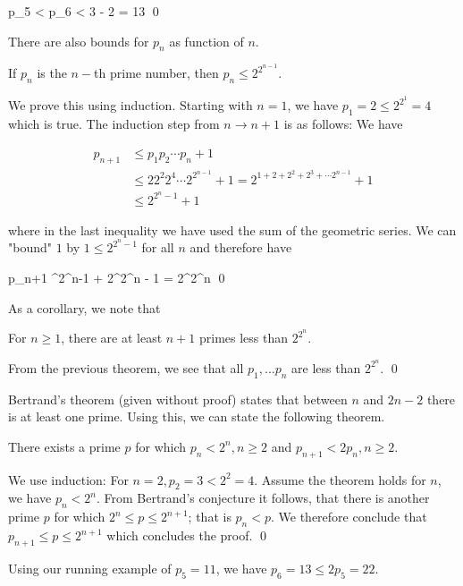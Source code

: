 \bee
p_5 < p_6 < 3  - 2 = 13 \qed
\eee

There are also bounds for $p_n$ as function of $n$.

\begin{theorem}
    If $p_n$ is the $n-$th prime number, then $p_n \leq 2^{2^{n-1}}$.
\end{theorem}

We prove this using induction. Starting with $n=1$, we have $p_1 = 2 \leq 2^{2^{1}} = 4$ which is true. The induction step from $n \rightarrow n+1$ is as follows: We have

\begin{align*}
p_{n+1} & \leq p_1 p_2 \cdots p_n + 1 \\
        & \leq 2 2^2 2^4 \cdots 2^{2^{n-1}} + 1 = 2^{1 + 2 + 2^2 + 2^3 + \cdots 2^{n-1}} + 1 \\ 
        & \leq 2^{2^{n}-1} + 1
\end{align*}

where in the last inequality we have used the sum of the geometric series. We can "bound" $1$ by $1 \leq 2^{2^{n} - 1}$ for all $n$ and therefore have

\bee
p_{n+1} ^{2^{n}-1} + 2^{2^{n} - 1} = 2^{2^{n}} \qed
\eee

As a corollary, we note that

\begin{theorem}
    For $n \geq 1$, there are at least $n+1$ primes less than $2^{2^{n}}$.
\end{theorem}

From the previous theorem, we see that all $p_1, \ldots p_n$ are less than $2^{2^{n}}$. \qed

Bertrand's theorem (given without proof) states that between $n$ and $2n-2$ there is at least one prime. Using this, we can state the following theorem.

\begin{theorem}
    There exists a prime $p$ for which $p_n < 2^n, n \geq 2$ and $p_{n+1} < 2 p_n, n \geq 2$.
\end{theorem}

We use induction: For $n = 2, p_2 = 3 < 2^2 = 4$. Assume the theorem holds for $n$, we have $p_n < 2^n$. From Bertrand's conjecture it follows, that there is another prime $p$ for which $2^n \leq p \leq 2^{n+1}$; that is $p_n < p$. We therefore conclude that $p_{n+1} \leq p \leq 2^{n+1}$ which concludes the proof. \qed

Using our running example of $p_5 = 11$, we have $p_6 = 13 \leq 2 p_5 = 22$.

